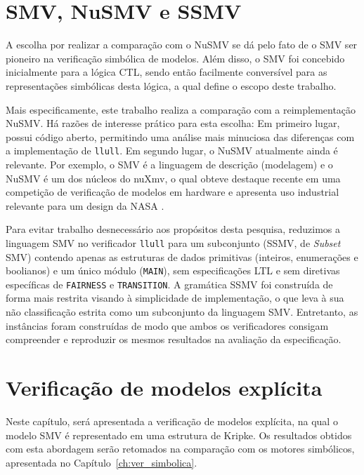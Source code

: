 \documentclass[cic,tc]{infufrgs}
\begin{document}
	\chapter{SMV, NuSMV e SSMV}
	A escolha por realizar a comparação com o NuSMV se dá pelo fato de o SMV ser pioneiro na verificação simbólica de modelos. 
	Além disso, o SMV foi concebido inicialmente para a lógica CTL, sendo então facilmente conversível para as representações simbólicas desta lógica, a qual define o escopo deste trabalho.
	
	Mais especificamente, este trabalho realiza a comparação com a reimplementação NuSMV. 
	Há razões de interesse prático para esta escolha: 
	Em primeiro lugar, possui código aberto, permitindo uma análise mais minuciosa das diferenças com a implementação de \texttt{llull}. 
	Em segundo lugar, o NuSMV atualmente ainda é relevante. 
	Por exemplo, o SMV é a linguagem de descrição (modelagem) e o NuSMV é um dos núcleos do nuXmv, o qual obteve destaque recente em uma competição de verificação de modelos em hardware \cite{HWMCC25} e apresenta uso industrial relevante para um design da NASA \cite{rozierMoXIIntermediateLanguage2025}.
	
	Para evitar trabalho desnecessário aos propósitos desta pesquisa, reduzimos a linguagem SMV no verificador \texttt{llull} para um subconjunto (SSMV, de \textit{Subset} SMV) contendo apenas as estruturas de dados primitivas (inteiros, enumerações e boolianos) e um único módulo (\texttt{MAIN}), sem especificações LTL e sem diretivas específicas de \texttt{FAIRNESS} e \texttt{TRANSITION}.
	A gramática SSMV foi construída de forma mais restrita visando à simplicidade de implementação, o que leva à sua não classificação estrita como um subconjunto da linguagem SMV. Entretanto, as instâncias foram construídas de modo que ambos os verificadores consigam compreender e reproduzir os mesmos resultados na avaliação da especificação.
	
	\chapter{Verificação de modelos explícita}
	
	Neste capítulo, será apresentada a verificação de modelos explícita, na qual o modelo SMV é representado em uma estrutura de Kripke. Os resultados obtidos com esta abordagem serão retomados na comparação com os motores simbólicos, apresentada no Capítulo~\ref{ch:ver_simbolica}.
	
	
\end{document}
